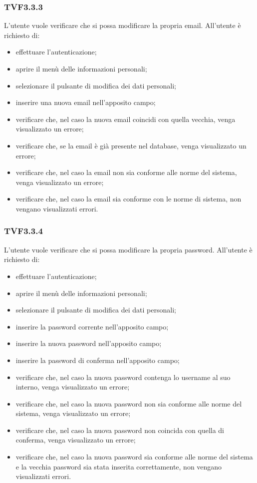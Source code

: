 		\subsubsection{TVF3.3.3}
			L'utente vuole verificare che si possa modificare la propria email. All'utente è richiesto di:
			\begin{itemize}
				\item effettuare l'autenticazione;
				\item aprire il menù delle informazioni personali;
				\item selezionare il pulsante di modifica dei dati personali;
				\item inserire una nuova email nell'apposito campo;
				\item verificare che, nel caso la nuova email coincidi con quella vecchia, venga visualizzato un errore;
				\item verificare che, se la email è già presente nel database, venga visualizzato un errore;
				\item verificare che, nel caso la email non sia conforme alle norme del sistema, venga visualizzato un errore;
				\item verificare che, nel caso la email sia conforme con le norme di sistema, non vengano visualizzati errori.
			\end{itemize}
			
		\subsubsection{TVF3.3.4}
			L'utente vuole verificare che si possa modificare la propria password. All'utente è richiesto di:
			\begin{itemize}
				\item effettuare l'autenticazione;
				\item aprire il menù delle informazioni personali;
				\item selezionare il pulsante di modifica dei dati personali;
				\item inserire la password corrente nell'apposito campo;
				\item inserire la nuova password nell'apposito campo;
				\item inserire la password di conferma nell'apposito campo;
				\item verificare che, nel caso la nuova password contenga lo username al suo interno, venga visualizzato un errore;
				\item verificare che, nel caso la nuova password non sia conforme alle norme del sistema, venga visualizzato un errore;
				\item verificare che, nel caso la nuova password non coincida con quella di conferma, venga visualizzato un errore;
				\item verificare che, nel caso la nuova password sia conforme alle norme del sistema e la vecchia password sia stata inserita correttamente, non vengano visualizzati errori.
			\end{itemize}
			
